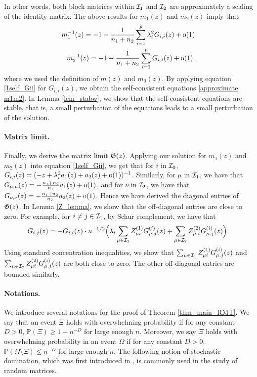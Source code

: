 In other words, both block matrices within $\cal I_1$ and $\cal I_2$ are approximately a scaling of the identity matrix.
The above results for $m_1(z)$ and $m_2(z)$ imply that
\begin{align*}
	m_1^{-1}(z) = -1- \frac{1}{n_1 + n_2} \sum_{i=1}^p \lambda_i^2 G_{i,i}(z)+ \oo(1) \\
	m_2^{-1}(z) = -1- \frac{1}{n_1 + n_2} \sum_{i=1}^p G_{i,i}(z)  + \oo(1).
\end{align*}
where we used the definition of $m(z)$ and $m_0(z)$.
By applying equation \eqref{1self_Gii} for $G_{i, i}(z)$, we obtain the self-consistent equations \ref{approximate m1m2}.
In Lemma \ref{lem_stabw}, we show that the self-consistent equations are stable, that is, a small perturbation of the equations leads to a small perturbation of the solution.

\paragraph{Matrix limit.}
Finally, we derive the matrix limit $\Gi(z)$.
Applying our solution for $m_1(z)$ and $m_2(z)$ into equation \eqref{1self_Gii}, we get that for $i$ in $\cal I_0$,
$G_{i, i}(z) = (-z +\lambda_i^2 a_{1}(z) + a_2(z)+\oo(1))^{-1}$.
Similarly, for $\mu$ in $\cal I_1$, we have that $G_{\mu, \mu}(z) = -\frac{n_1 + n_2}{n_1}a_{1}(z)+\oo(1)$, and for $\nu$ in $\cal I_2$, we have that $G_{\nu, \nu}(z) = -\frac{n_1 + n_2}{n_2}a_{2}(z)+\oo(1)$.
Hence we have derived the diagonal entries of $\Gi(z)$.
In Lemma \ref{Z_lemma}, we show that the off-diagonal entries are close to zero.
For example, for $i\ne j\in \cal I_1$, by Schur complement, we have that
$$G_{i,j}(z) = -G_{i,i}(z)\cdot {n^{-1/2}}\Big({\lambda_i}\sum_{\mu \in \cal I_1} Z^{(1)}_{\mu i} G^{(i)}_{\mu, j}(z) + \sum_{\mu \in \cal I_2} Z^{(2)}_{\mu, i} G^{(i)}_{\mu, j}(z) \Big).$$
Using standard concentration inequalities, we show that $\sum_{\mu \in \cal I_1} Z^{(1)}_{\mu i} G^{(i)}_{\mu, j}(z)$ and $\sum_{\mu \in \cal I_2} Z^{(2)}_{\mu i} G^{(i)}_{\mu, j}(z)$ are both close to zero.
The other off-diagonal entries are bounded similarly.


\paragraph{Notations.}
We introduce several notations for the proof of Theorem \ref{thm_main_RMT}.
We say that an event $\Xi$ holds with overwhelming probability if for any constant $D>0$, $\mathbb P(\Xi)\ge 1- n^{-D}$ for large enough $n$.
Moreover, we say $\Xi$ holds with overwhelming probability in an event $\Omega$ if for any constant $D>0$, $\mathbb P(\Omega\setminus \Xi)\le n^{-D}$ for large enough $n$.
The following notion of stochastic domination, which was first introduced in \cite{Average_fluc}, is commonly used in the study of random matrices.

